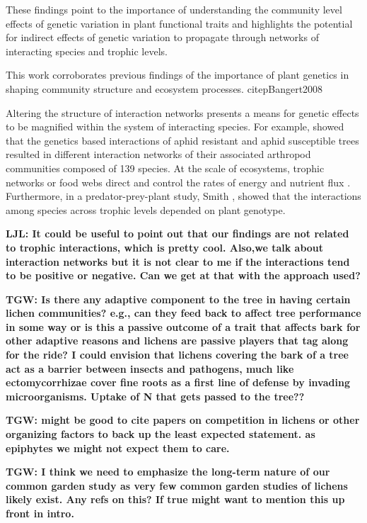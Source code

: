 \documentclass[11pt,twocolumn,twoside,lineno]{pnas-new}
\begin{document}
These findings point to the importance of understanding the community
level effects of genetic variation in plant functional traits and
highlights the potential for indirect effects of genetic variation to
propagate through networks of interacting species and trophic levels.

This work corroborates previous findings of the importance of plant
genetics in shaping community structure and ecosystem
processes. citep{Bangert2008}


Altering the structure of interaction networks
presents a means for genetic effects to be magnified within the system
of interacting species. For example, \citep{Keith2017} showed that the
genetics based interactions of aphid resistant and aphid susceptible
trees resulted in different interaction networks of their associated
arthropod communities composed of 139 species. At the scale of
ecosystems, trophic networks or food webs direct and control the rates
of energy and nutrient flux \cite{Borgatti2006}. Furthermore, in a
predator-prey-plant study, Smith \cite{Smith2011}, showed that the
interactions among species across trophic levels depended on plant
genotype.

\textbf{LJL:  It could be useful to point out that our findings are
  not related to trophic interactions, which is pretty cool. Also,we
  talk about interaction networks but it is not clear to me if the
  interactions tend to be positive or negative. Can we get at that
  with the approach used?}


\textbf{TGW:  Is there any adaptive component to the tree in having
  certain lichen communities?  e.g., can they feed back to affect tree
  performance in some way or is this a passive outcome of a trait that
  affects bark for other adaptive reasons and lichens are passive
  players that tag along for the ride?  I could envision that lichens
  covering the bark of a tree act as a barrier between insects and
  pathogens, much like ectomycorrhizae cover fine roots as a first
  line of defense by invading microorganisms.  Uptake of N that gets
  passed to the tree??}


\textbf{TGW: might be good to cite papers on competition in lichens or
  other organizing factors to back up the least expected statement.
  as epiphytes we might not expect them to care.}

\textbf{TGW: I think we need to emphasize the long-term nature of our
  common garden study as very few common garden studies of lichens
  likely exist. Any refs on this? If true might want to mention this
  up front in intro.}
\end{document}
